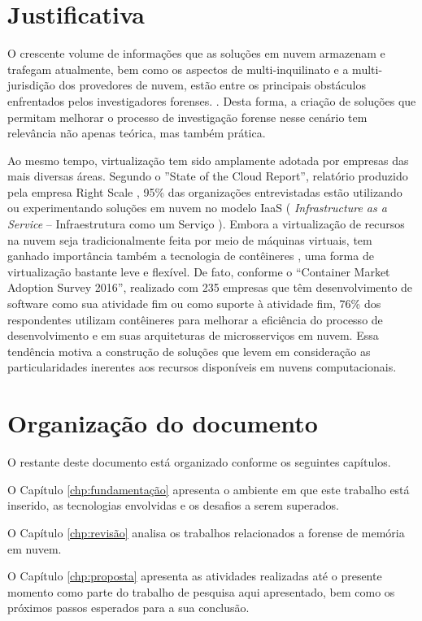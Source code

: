 \section{Justificativa}
\label{sec:intro-justificativa}

O crescente volume de informações que as soluções em nuvem armazenam e trafegam atualmente, bem como os aspectos de multi-inquilinato e a multi-jurisdição dos provedores de nuvem, estão entre os principais obstáculos enfrentados pelos investigadores forenses. \cite{QuickIncreaseVolumeImpact:2014} \cite{BashAdvInForensics:2015}.
%
Desta forma, a criação de soluções que permitam melhorar o processo de investigação forense nesse cenário tem relevância não apenas teórica, mas também prática.


Ao mesmo tempo, virtualização tem sido amplamente adotada por empresas das mais diversas áreas. 
%
Segundo o ''State of the Cloud Report'', relatório produzido pela empresa Right Scale \cite{RightScale2017}, 95\% das organizações entrevistadas estão utilizando ou experimentando soluções em nuvem no modelo IaaS ( \textit{Infrastructure as a Service} -- Infraestrutura como um Serviço ).
%
Embora a virtualização de recursos na nuvem seja tradicionalmente feita por meio de máquinas virtuais, tem ganhado importância também a tecnologia de contêineres \cite{containers-tech:2014}, uma forma de virtualização bastante leve e flexível.
%
De fato, conforme o ``Container Market Adoption Survey 2016'', realizado com 235 empresas que têm desenvolvimento de software como sua atividade fim ou como suporte à atividade fim, 76\% dos respondentes utilizam contêineres para melhorar a eficiência do processo de desenvolvimento e em suas arquiteturas de microsserviços em nuvem.
%
Essa tendência motiva a construção de soluções que levem em consideração as particularidades inerentes aos recursos disponíveis em nuvens computacionais.


\section{Organização do documento}
\label{sec:intro-organizacao}

O restante deste documento está organizado conforme os seguintes capítulos.

O Capítulo \ref{chp:fundamentação} apresenta o ambiente em que este trabalho está inserido, as tecnologias envolvidas e os desafios a serem superados. 

O Capítulo \ref{chp:revisão} analisa os trabalhos relacionados a forense de memória em nuvem. 

O Capítulo \ref{chp:proposta} apresenta as atividades realizadas até o presente momento como parte do trabalho de pesquisa aqui apresentado, bem como os próximos passos esperados para a sua conclusão.